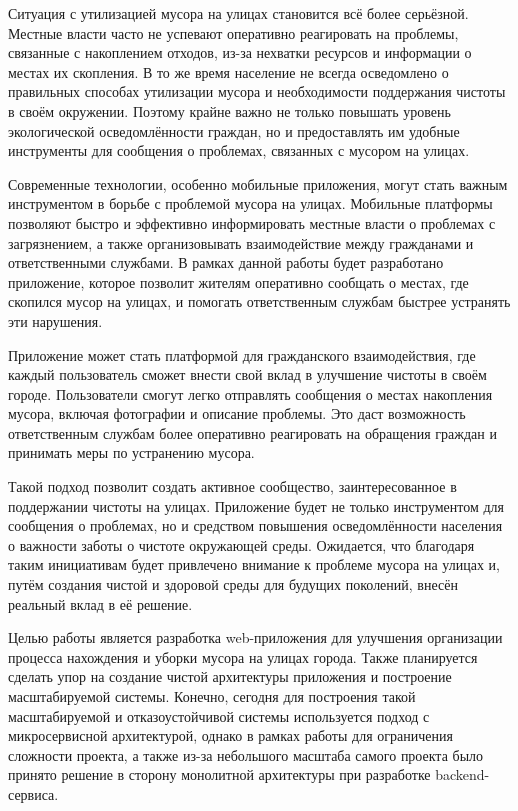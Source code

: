 \documentclass[diploma]{SCWorks}
\begin{document}
Ситуация с утилизацией мусора на улицах становится всё более серьёзной. 
Местные власти часто не успевают оперативно реагировать на проблемы, связанные 
с накоплением отходов, из-за нехватки ресурсов и информации о местах их 
скопления. В то же время население не всегда осведомлено о правильных 
способах утилизации мусора и необходимости поддержания чистоты в своём 
окружении. Поэтому крайне важно не только повышать уровень экологической 
осведомлённости граждан, но и предоставлять им удобные инструменты для 
сообщения о проблемах, связанных с мусором на улицах.

Современные технологии, особенно мобильные приложения, могут стать важным 
инструментом в борьбе с проблемой мусора на улицах. Мобильные платформы 
позволяют быстро и эффективно информировать местные власти о проблемах с 
загрязнением, а также организовывать взаимодействие между гражданами и 
ответственными службами. В рамках данной работы будет разработано 
приложение, которое позволит жителям оперативно сообщать о местах, где 
скопился мусор на улицах, и помогать ответственным службам быстрее устранять 
эти нарушения.

Приложение может стать платформой для гражданского взаимодействия, где каждый 
пользователь сможет внести свой вклад в улучшение чистоты в своём городе. 
Пользователи смогут легко отправлять сообщения о местах накопления мусора, 
включая фотографии и описание проблемы. Это даст возможность ответственным 
службам более оперативно реагировать на обращения граждан и принимать меры по 
устранению мусора.

Такой подход позволит создать активное сообщество, заинтересованное в 
поддержании чистоты на улицах. Приложение будет не только инструментом для 
сообщения о проблемах, но и средством повышения осведомлённости населения о 
важности заботы о чистоте окружающей среды. Ожидается, что благодаря таким 
инициативам будет привлечено внимание к проблеме мусора на улицах и, 
путём создания чистой и здоровой среды для будущих поколений, внесён
реальный вклад в её решение.

Целью работы является разработка web-приложения для улучшения организации
процесса нахождения и уборки мусора на улицах города. Также планируется сделать
упор на создание чистой архитектуры приложения и построение 
масштабируемой системы. Конечно, сегодня для построения такой масштабируемой и 
отказоустойчивой системы используется подход с микросервисной архитектурой, 
однако в рамках работы для ограничения сложности проекта, а также
из-за небольшого масштаба самого проекта было принято решение в сторону
монолитной архитектуры при разработке backend-сервиса.
\end{document}

